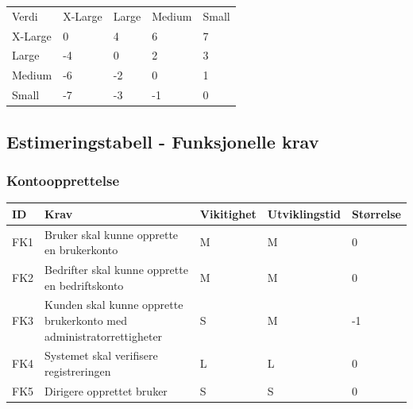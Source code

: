 \documentclass[12pt]{article}
\newcommand{\invis}{\phantom{a}}
\newcommand{\cellr}{\cellcolor{red!25}}
\newcommand{\cello}{\cellcolor{orange!25}}
\newcommand{\celly}{\cellcolor{yellow!25}}
\newcommand{\celll}{\cellcolor{lime!25}}
\newcommand{\cellg}{\cellcolor{green!25}}
\begin{document}
    \begin{tabular}{|p{2cm}|
        >{\centering\arraybackslash}p{3cm}|
        >{\centering\arraybackslash}p{3cm}|
        >{\centering\arraybackslash}p{3cm}|
        >{\centering\arraybackslash}p{3cm}|}     
        \hline 
        \invis & \multicolumn{4}{|c|}{Utviklingsstørrelse}\\
        \hline
        Verdi & X-Large & Large & Medium & Small\\
        \hline
        X-Large &   \celly0 &
                    \cellg4 &
                    \cellg6 &
                    \cellg7 \\
        \hline
        Large &     \cellr-4 &
                    \celly0 &
                    \celll2 &
                    \cellg3 \\
        \hline
        Medium &    \cellr-6 &
                    \cello-2 &
                    \celly0 &
                    \celll1 \\
        \hline
        Small &     \cellr-7 &
                    \cellr-3 &
                    \cello-1 &
                    \celly0 \\
        \hline 
    \end{tabular}

    \subsection{Estimeringstabell - Funksjonelle krav}

        \subsubsection{Kontoopprettelse}
        
        \begin{tabular}{|p{2cm}|p{6cm}|
            >{\centering\arraybackslash}p{2cm}|
            >{\centering\arraybackslash}p{2cm}|
            >{\centering\arraybackslash}p{2cm}|} 
            \hline
            \bf ID & \bf Krav & \bf Vikitighet & \bf Utviklingstid & \bf Størrelse\\
            \hline
            FK1
            &
            Bruker skal kunne opprette en brukerkonto
            & M & M & \celly 0\\
            \hline
            FK2
            &
            Bedrifter skal kunne opprette en bedriftskonto
            & M & M & \celly 0\\
            \hline
            FK3
            &
            Kunden skal kunne opprette brukerkonto med administratorrettigheter
            & S & M & \cello -1\\
            \hline
            FK4
            &
            Systemet skal verifisere registreringen
            & L & L & \celly 0\\
            \hline
            FK5
            &
            Dirigere opprettet bruker
            & S & S & \celly 0\\ %
            \hline
        \end{tabular}
        
\end{document}

